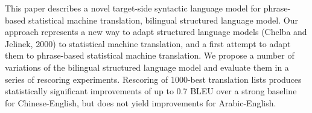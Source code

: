 This paper describes a novel target-side syntactic language model for phrase-based statistical machine translation, bilingual structured language model. Our approach represents a new way to adapt structured language models (Chelba and Jelinek, 2000) to statistical machine translation, and a first attempt to adapt them to phrase-based statistical machine translation. We propose a number of variations of the bilingual structured language model and evaluate them in a series of rescoring experiments. Rescoring of 1000-best translation lists produces statistically significant improvements of up to 0.7 BLEU over a strong baseline for Chinese-English, but does not yield improvements for Arabic-English.
